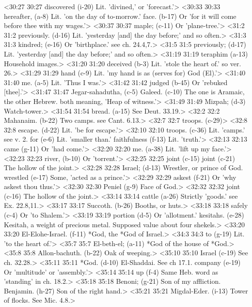 <30:27 30:27  discovered (i-20)  Lit. 'divined,' or 'forecast.'>
<30:33 30:33  hereafter, (a-8)  Lit. 'on the day of to-morrow.'
  face. (b-17)  Or 'for it will come before thee with my wages.'>
<30:37 30:37  maple; (c-11)  Or 'plane-tree.'>
<31:2 31:2  previously. (d-16)  Lit. 'yesterday [and] the day before;' and so often.>
<31:3 31:3  kindred; (e-16)  Or 'birthplace.' see ch. 24.4,7.>
<31:5 31:5  previously; (d-17)  Lit. 'yesterday [and] the day before;' and so often.>
<31:19 31:19  teraphim (a-13)  Household images.>
<31:20 31:20  deceived (b-3)  Lit. 'stole the heart of.' so ver. 26.>
<31:29 31:29  hand (c-9)  Lit. 'my hand is as (serves for) God (El).'>
<31:40 31:40  me. (a-5)  Lit. 'Thus I was.'>
<31:42 31:42  judged (b-45)  Or 'rebuked [thee].'>
<31:47 31:47  Jegar-sahadutha, (c-5)  Galeed. (c-10)
  The one is Aramaic, the other Hebrew. both meaning, 'Heap of  witness.'>
<31:49 31:49  Mizpah; (d-3)  Watch-tower.>
<31:54 31:54  bread. (a-15)  See Deut. 33.19.>
<32:2 32:2  Mahanaim. (b-22)  Two camps. see Cant. 6.13.>
<32:7 32:7  troops. (c-29)>
<32:8 32:8  escape. (d-22)  Lit. 'be for escape.'>
<32:10 32:10  troops. (c-36)  Lit. 'camps.' see v. 2.
  for (e-6)  Lit. 'smaller than.'
  faithfulness (f-13)  Lit. 'truth.'>
<32:13 32:13  came (g-11)  Or 'had come.'>
<32:20 32:20  me. (a-38)  Lit. 'lift up my face.'>
<32:23 32:23  river, (b-10)  Or 'torrent.'>
<32:25 32:25  joint (c-15)  joint (c-21)
 The hollow of the joint.>
<32:28 32:28  Israel; (d-13)  Wrestler, or prince of God.
  wrestled (e-17)  Some, 'acted as a prince.'>
<32:29 32:29  askest (f-21)  Or 'why askest thou thus.'>
<32:30 32:30  Peniel (g-9)  Face of God.>
<32:32 32:32  joint (c-16)  The hollow of the joint.>
<33:14 33:14  cattle (a-26)  Strictly 'goods.' see Ex. 22.8,11.>
<33:17 33:17  Succoth. (b-26)  Booths, or huts.>
<33:18 33:18  safely (c-4)  Or 'to Shalem.'>
<33:19 33:19  portion (d-5)  Or 'allotment.'
  kesitahs. (e-28)  Kesitah, a weight of precious metal. Supposed value about  four shekels.>
<33:20 33:20  El-Elohe-Israel. (f-11)  *God, the *God of Israel.>
<34:3 34:3  to (g-19)  Lit. 'to the heart of.'>
<35:7 35:7  El-beth-el; (a-11)  *God of the house of *God.>
<35:8 35:8  Allon-bachuth. (b-22)  Oak of weeping.>
<35:10 35:10  Israel (c-19)  See ch. 32.28.>
<35:11 35:11  *God. (d-10)  El-Shaddai. See ch 17.1.
  company (e-19)  Or 'multitude' or 'assembly.'>
<35:14 35:14  up (f-4)  Same Heb. word as 'standing' in ch. 18.2.>
<35:18 35:18  Benoni; (g-21)  Son of my affliction.
  Benjamin. (h-27)  Son of the right hand.>
<35:21 35:21  Migdal-Eder. (i-13)  Tower of flocks. See Mic. 4.8.>
